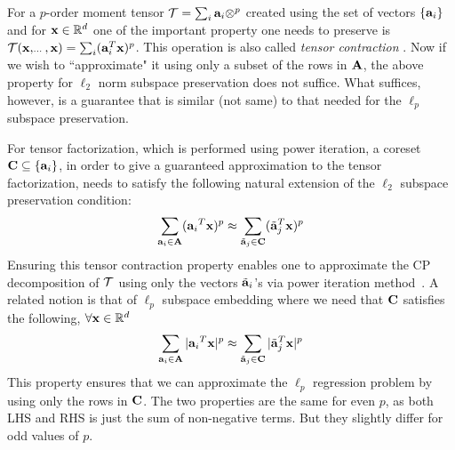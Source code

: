 For a $p$-order moment tensor $\mathbf{\mathcal{T}} = \sum_i \mathbf{a}_{i}\otimes^p$ created using the set of vectors $\{\mathbf{a}_{i}\}$ and for $\mathbf{x} \in \mathbb{R}^{d}$ one of the important property one needs to preserve is $\mathbf{\mathcal{T}}(\mathbf{x}, _{\cdots}, \mathbf{x}) = \sum_{i} (\mathbf{a}_{i}^{T}\mathbf{x})^{p}$. This operation is also called {\em tensor contraction} \cite{song2016sublinear}. Now if we wish to ``approximate" it using only a subset of the rows in $\mathbf{A}$, the above property for $\ell_2$ norm subspace preservation does not suffice. What suffices, however, is a guarantee that is similar (not same) to that needed for the $\ell_p$ subspace preservation.  

For tensor factorization, which is performed using power iteration, a coreset $\mathbf{C} \subseteq \{\mathbf{a}_{i}\}$, in order to give a guaranteed approximation to the tensor factorization, needs to satisfy the following natural extension of the $\ell_2$ subspace preservation condition:
\begin{align*}
\sum_{\mathbf{a}_{i} \in \mathbf{A}}({\mathbf{a}_{i}}^T \mathbf{x})^p \approx \sum_{\tilde{\mathbf{a}}_{j} \in \mathbf{C}}({\tilde{\mathbf{a}}_{j}}^T \mathbf{x})^p
\end{align*}
 Ensuring this tensor contraction property enables one to approximate the CP decomposition of $\mathbf{\mathcal{T}}$ using only the vectors $\tilde{\mathbf{a}}_{i}$'s via power iteration method~\cite{anandkumar2014tensor}. A related notion is that of $\ell_p$ subspace embedding where we need that $\mathbf{C}$ satisfies the following, $\forall \mathbf{x}\in \mathbb{R}^{d}$
\begin{align*}
\sum_{\mathbf{a}_{i} \in \mathbf{A}}|{\mathbf{a}_{i}}^T \mathbf{x}|^p \approx \sum_{\tilde{\mathbf{a}}_{j} \in \mathbf{C}}|{\tilde{\mathbf{a}}_{j}}^T \mathbf{x}|^p
\end{align*}
This property ensures that we can approximate the $\ell_p$ regression problem by using only the rows in $\mathbf{C}$. 
The two properties are the same for even $p$, as both LHS and RHS is just the sum of non-negative terms. But they slightly differ for odd values of $p$.


